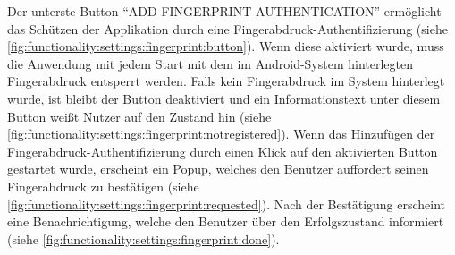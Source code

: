 \documentclass[a4paper]{article}
\begin{document}
Der unterste Button "`ADD FINGERPRINT AUTHENTICATION"' ermöglicht das Schützen der Applikation durch eine Fingerabdruck-Authentifizierung (siehe \autoref{fig:functionality:settings:fingerprint:button}). Wenn diese aktiviert wurde, muss die Anwendung mit jedem Start mit dem im Android-System hinterlegten Fingerabdruck entsperrt werden. Falls kein Fingerabdruck im System hinterlegt wurde, ist bleibt der Button deaktiviert und ein Informationstext unter diesem Button weißt Nutzer auf den Zustand hin (siehe \autoref{fig:functionality:settings:fingerprint:notregistered}). Wenn das Hinzufügen der Fingerabdruck-Authentifizierung durch einen Klick auf den aktivierten Button gestartet wurde, erscheint ein Popup, welches den Benutzer auffordert seinen Fingerabdruck zu bestätigen (siehe \autoref{fig:functionality:settings:fingerprint:requested}). Nach der Bestätigung erscheint eine Benachrichtigung, welche den Benutzer über den Erfolgszustand informiert (siehe \autoref{fig:functionality:settings:fingerprint:done}).
\end{document}
